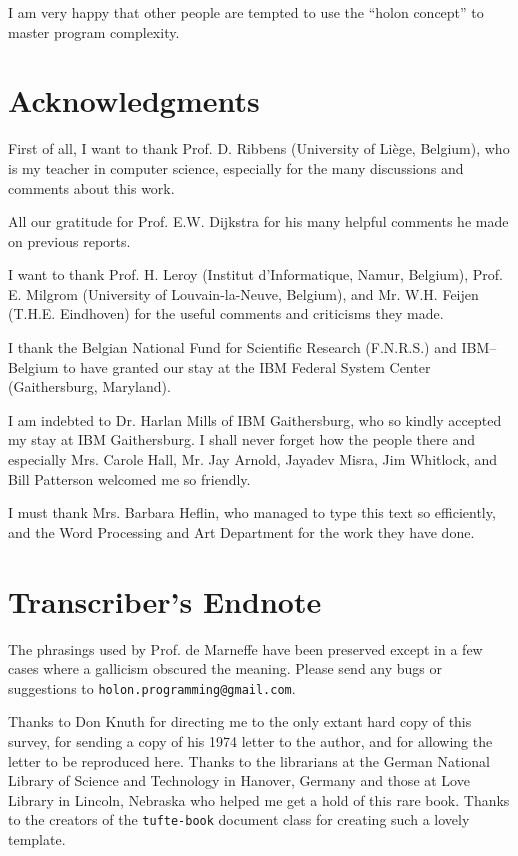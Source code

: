 \documentclass[openany,nobib]{tufte-book}
\begin{document}
I am very happy that other people are tempted to use the ``holon concept'' to
master program complexity.

\chapter{Acknowledgments}

First of all, I want to thank Prof. D. Ribbens (University of Li\`ege,
Belgium), who is my teacher in computer science, especially  for the many
discussions and comments about this work.

All our gratitude for Prof. E.W. Dijkstra for his many helpful comments he made
on previous reports.

I want to thank Prof. H. Leroy (Institut d'Informatique, Namur, Belgium), Prof.
E. Milgrom (University of Louvain-la-Neuve, Belgium), and Mr. W.H. Feijen
(T.H.E. Eindhoven) for the useful comments and criticisms they made.

I thank the Belgian National Fund for Scientific Research (F.N.R.S.) and
IBM--Belgium to have granted our stay at the IBM Federal System Center
(Gaithersburg, Maryland).

I am indebted to Dr. Harlan Mills of IBM Gaithersburg, who so kindly accepted
my stay at IBM Gaithersburg. I shall never forget how the people there and
especially Mrs. Carole Hall, Mr. Jay Arnold, Jayadev Misra, Jim Whitlock, and
Bill Patterson welcomed me so friendly.

I must thank Mrs. Barbara Heflin, who managed to type this text so efficiently,
and the Word Processing and Art Department for the work they have done.

\chapter{Transcriber's Endnote}

The phrasings used by Prof. de Marneffe have been preserved except in a few
cases where a gallicism obscured the meaning. Please send any bugs or
suggestions to {\tt holon.programming@gmail.com}.

Thanks to Don Knuth for directing me to the only extant hard copy of this
survey, for sending a copy of his 1974 letter to the author, and for
allowing the letter to be reproduced here. Thanks to the librarians at the
German National Library of Science and Technology in Hanover, Germany and those
at Love Library in Lincoln, Nebraska who helped me get a hold of this rare
book. Thanks to the creators of the {\tt tufte-book} document class for
creating such a lovely template.
\end{document}
